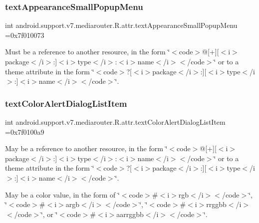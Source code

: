 \subsubsection{\texorpdfstring{text\+Appearance\+Small\+Popup\+Menu}{textAppearanceSmallPopupMenu}}
{\footnotesize\ttfamily int android.\+support.\+v7.\+mediarouter.\+R.\+attr.\+text\+Appearance\+Small\+Popup\+Menu =0x7f010073\hspace{0.3cm}{\ttfamily [static]}}

Must be a reference to another resource, in the form \char`\"{}$<$code$>$@\mbox{[}+\mbox{]}\mbox{[}$<$i$>$package$<$/i$>$\+:\mbox{]}$<$i$>$type$<$/i$>$\+:$<$i$>$name$<$/i$>$$<$/code$>$\char`\"{} or to a theme attribute in the form \char`\"{}$<$code$>$?\mbox{[}$<$i$>$package$<$/i$>$\+:\mbox{]}\mbox{[}$<$i$>$type$<$/i$>$\+:\mbox{]}$<$i$>$name$<$/i$>$$<$/code$>$\char`\"{}. \mbox{\label{classandroid_1_1support_1_1v7_1_1mediarouter_1_1R_1_1attr_a3eb66c77f697e2794bfb8078badc18ec}} 
\subsubsection{\texorpdfstring{text\+Color\+Alert\+Dialog\+List\+Item}{textColorAlertDialogListItem}}
{\footnotesize\ttfamily int android.\+support.\+v7.\+mediarouter.\+R.\+attr.\+text\+Color\+Alert\+Dialog\+List\+Item =0x7f0100a9\hspace{0.3cm}{\ttfamily [static]}}

May be a reference to another resource, in the form \char`\"{}$<$code$>$@\mbox{[}+\mbox{]}\mbox{[}$<$i$>$package$<$/i$>$\+:\mbox{]}$<$i$>$type$<$/i$>$\+:$<$i$>$name$<$/i$>$$<$/code$>$\char`\"{} or to a theme attribute in the form \char`\"{}$<$code$>$?\mbox{[}$<$i$>$package$<$/i$>$\+:\mbox{]}\mbox{[}$<$i$>$type$<$/i$>$\+:\mbox{]}$<$i$>$name$<$/i$>$$<$/code$>$\char`\"{}. 

May be a color value, in the form of \char`\"{}$<$code$>$\#$<$i$>$rgb$<$/i$>$$<$/code$>$\char`\"{}, \char`\"{}$<$code$>$\#$<$i$>$argb$<$/i$>$$<$/code$>$\char`\"{}, \char`\"{}$<$code$>$\#$<$i$>$rrggbb$<$/i$>$$<$/code$>$\char`\"{}, or \char`\"{}$<$code$>$\#$<$i$>$aarrggbb$<$/i$>$$<$/code$>$\char`\"{}. \mbox{\label{classandroid_1_1support_1_1v7_1_1mediarouter_1_1R_1_1attr_a4bc2751096afde8d80d665c65cd3fff0}} 
